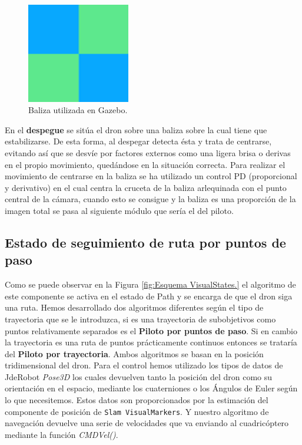 \begin{figure}[H]
	\begin{center}
		\includegraphics[width=0.4\textwidth]{imag/IMG33.png}
				\caption{Baliza utilizada en Gazebo.}
		\label{fig:Baliza.}	
	\end{center}
\end{figure}

\hspace{1cm} En el \textbf{despegue} se sitúa el dron sobre una baliza sobre la cual tiene que estabilizarse. De esta forma, al despegar detecta ésta y trata de centrarse, evitando así que se desvíe por factores externos como una ligera brisa o derivas en el propio movimiento, quedándose en la situación correcta. Para realizar el movimiento de centrarse en la baliza se ha utilizado un control PD (proporcional y derivativo) en el cual centra la cruceta de la baliza arlequinada con el punto central de la cámara, cuando esto se consigue y la baliza es una proporción de la imagen total se pasa al siguiente módulo que sería el del piloto.

\subsection{Estado de seguimiento de ruta por puntos de paso}
\hspace{1cm} Como se puede observar en la Figura \ref{fig:Esquema VisualStates.} el algoritmo de este componente se activa en el estado de Path y se encarga de que el dron siga una ruta. Hemos desarrollado dos algoritmos diferentes según el tipo de trayectoria que se le introduzca, si es una trayectoria de subobjetivos como puntos relativamente separados es el \textbf{Piloto por puntos de paso}. Si en cambio la trayectoria es una ruta de puntos prácticamente continuos entonces se trataría del \textbf{Piloto por trayectoria}. Ambos algoritmos se basan en la posición tridimensional del dron. Para el control hemos utilizado los tipos de datos de JdeRobot \textit{Pose3D} los cuales devuelven tanto la posición del dron como su orientación en el espacio, mediante los cuaterniones o los Ángulos de Euler según lo que necesitemos. Estos datos son proporcionados por la estimación del componente de posición de \texttt{Slam VisualMarkers}. Y nuestro algoritmo de navegación devuelve una serie de velocidades que va enviando al cuadricóptero mediante la función \textit{CMDVel()}.

